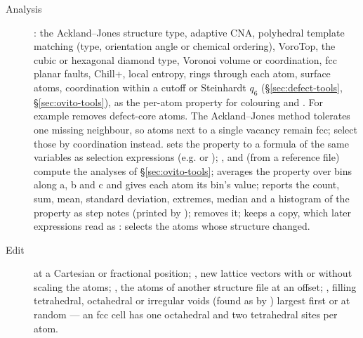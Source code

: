\begin{description}
\item[Analysis] : the Ackland--Jones structure type, adaptive CNA, polyhedral template matching (type, orientation angle or chemical ordering), VoroTop, the cubic or hexagonal diamond type, Voronoi volume or coordination, fcc planar faults, Chill+, local entropy, rings through each atom, surface atoms, coordination within a cutoff or Steinhardt $q_6$ (\S\ref{sec:defect-tools}, \S\ref{sec:ovito-tools}), as the per-atom property for colouring and . For example  removes defect-core atoms. The Ackland--Jones method tolerates one missing neighbour, so atoms next to a single vacancy remain fcc; select those by coordination instead.  sets the property to a formula of the same variables as selection expressions (e.g.  or ); ,  and  (from a reference file) compute the analyses of \S\ref{sec:ovito-tools};  averages the property over bins along a, b and c and gives each atom its bin's value;  reports the count, sum, mean, standard deviation, extremes, median and a histogram of the property as step notes (printed by );  removes it;  keeps a copy, which later expressions read as :  selects the atoms whose structure changed.
\item[Edit]  at a Cartesian or fractional position; , new lattice vectors with or without scaling the atoms; , the atoms of another structure file at an offset; , filling tetrahedral, octahedral or irregular voids (found as by ) largest first or at random --- an fcc cell has one octahedral and two tetrahedral sites per atom.

\end{description}
